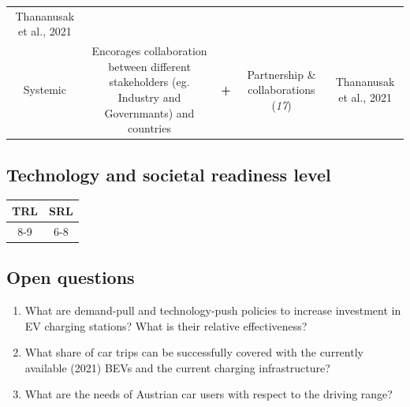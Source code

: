 \documentclass[
]{book}
\providecommand{\tightlist}{%
  \setlength{\itemsep}{0pt}\setlength{\parskip}{0pt}}
\begin{document}
\begin{longtable}[]{@{}ccccc@{}}
\begin{minipage}[t]{0.17\columnwidth}
Thananusak et al., 2021\strut
\end{minipage}\tabularnewline
\begin{minipage}[t]{0.17\columnwidth}\centering
Systemic\strut
\end{minipage} & \begin{minipage}[t]{0.16\columnwidth}\centering
Encorages collaboration between different stakeholders (eg. Industry and Governmants) and countries\strut
\end{minipage} & \begin{minipage}[t]{0.17\columnwidth}\centering
\textbf{+}\strut
\end{minipage} & \begin{minipage}[t]{0.17\columnwidth}\centering
Partnership \& collaborations (\emph{17})\strut
\end{minipage} & \begin{minipage}[t]{0.17\columnwidth}\centering
Thananusak et al., 2021\strut
\end{minipage}\tabularnewline
\bottomrule
\end{longtable}

\hypertarget{technology-and-societal-readiness-level-7}{%
\subsection*{Technology and societal readiness level}\label{technology-and-societal-readiness-level-7}}

\begin{longtable}[]{@{}cc@{}}
\toprule
TRL & SRL\tabularnewline
\midrule
\endhead
8-9 & 6-8\tabularnewline
\bottomrule
\end{longtable}

\hypertarget{open-questions-7}{%
\subsection*{Open questions}\label{open-questions-7}}

\begin{enumerate}
\def\labelenumi{\arabic{enumi}.}
\tightlist
\item
  What are demand-pull and technology-push policies to increase investment in EV charging stations? What is their relative effectiveness?
\item
  What share of car trips can be successfully covered with the currently available (2021) BEVs and the current charging infrastructure?
\item
  What are the needs of Austrian car users with respect to the driving range?
\end{enumerate}
\end{document}
